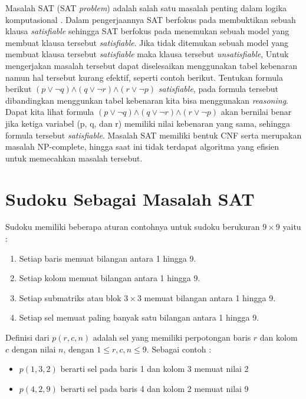 Masalah SAT (SAT \textit{problem}) adalah salah satu masalah penting dalam logika komputasional \cite{huth2004logic}. Dalam pengerjaannya SAT berfokus pada membuktikan sebuah klausa \textit{satisfiable} sehingga SAT berfokus pada menemukan sebuah model yang membuat klausa tersebut \textit{satisfiable}. Jika tidak ditemukan sebuah model yang membuat klausa tersebut \textit{satisfiable} maka klausa tersebut \textit{unsatisfiable}, Untuk mengerjakan masalah tersebut dapat diselesaikan menggunakan tabel kebenaran namun hal tersebut kurang efektif, seperti contoh berikut. Tentukan formula berikut $\left(p\vee\neg q\right)$$\wedge$$\left(q\vee\neg r\right)$$\wedge$$\left(r\vee\neg p\right)$ \textit{satisfiable}, pada formula tersebut dibandingkan menggunkan tabel kebenaran kita bisa menggunakan \textit{reasoning}. Dapat kita lihat formula $\left(p\vee\neg q\right)$$\wedge$$\left(q\vee\neg r\right)$$\wedge$$\left(r\vee\neg p\right)$ akan bernilai benar jika ketiga variabel (p, q, dan r) memiliki nilai kebenaran yang sama, sehingga formula tersebut \textit{satisfiable}. Masalah SAT memiliki bentuk CNF serta merupakan masalah NP-complete, hingga saat ini tidak
terdapat algoritma yang efisien untuk memecahkan masalah tersebut. 



\section{Sudoku Sebagai Masalah SAT}
Sudoku memiliki beberapa aturan contohnya untuk sudoku berukuran  $9 \times 9$ yaitu :

\begin{enumerate}
	\item Setiap baris memuat bilangan antara 1 hingga 9.
	\item Setiap kolom memuat bilangan antara 1 hingga 9.
	\item Setiap submatriks atau blok $3 \times 3$
	 memuat bilangan antara 1 hingga 9.
	\item Setiap sel memuat paling banyak satu bilangan antara 1 hingga 9.
\end{enumerate}

Definisi dari $p\left(r,c,n\right)$ adalah sel yang memiliki perpotongan baris $r$ dan kolom $c$ dengan nilai $n$, dengan $1 \leq r,c,n \leq 9$. Sebagai contoh :

\begin{itemize}
	\item $p\left(1,3,2\right)$ berarti sel pada baris 1 dan kolom 3 memuat nilai 2
	\item $p\left(4,2,9\right)$ berarti sel pada baris 4 dan kolom 2 memuat nilai 9
\end{itemize}

